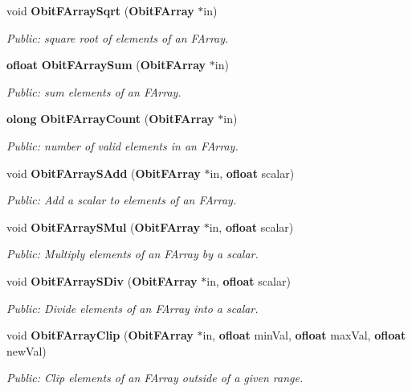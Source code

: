 \begin{CompactItemize}
void {\bf Obit\-FArray\-Sqrt} ({\bf Obit\-FArray} $\ast$in)
\begin{CompactList}\small\item\em Public: square root of elements of an FArray. \item\end{CompactList}\item 
{\bf ofloat} {\bf Obit\-FArray\-Sum} ({\bf Obit\-FArray} $\ast$in)
\begin{CompactList}\small\item\em Public: sum elements of an FArray. \item\end{CompactList}\item 
{\bf olong} {\bf Obit\-FArray\-Count} ({\bf Obit\-FArray} $\ast$in)
\begin{CompactList}\small\item\em Public: number of valid elements in an FArray. \item\end{CompactList}\item 
void {\bf Obit\-FArray\-SAdd} ({\bf Obit\-FArray} $\ast$in, {\bf ofloat} scalar)
\begin{CompactList}\small\item\em Public: Add a scalar to elements of an FArray. \item\end{CompactList}\item 
void {\bf Obit\-FArray\-SMul} ({\bf Obit\-FArray} $\ast$in, {\bf ofloat} scalar)
\begin{CompactList}\small\item\em Public: Multiply elements of an FArray by a scalar. \item\end{CompactList}\item 
void {\bf Obit\-FArray\-SDiv} ({\bf Obit\-FArray} $\ast$in, {\bf ofloat} scalar)
\begin{CompactList}\small\item\em Public: Divide elements of an FArray into a scalar. \item\end{CompactList}\item 
void {\bf Obit\-FArray\-Clip} ({\bf Obit\-FArray} $\ast$in, {\bf ofloat} min\-Val, {\bf ofloat} max\-Val, {\bf ofloat} new\-Val)
\begin{CompactList}\small\item\em Public: Clip elements of an FArray outside of a given range. \item\end{CompactList}\item 

\end{CompactItemize}
